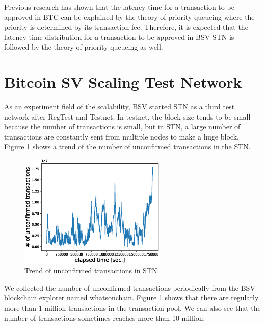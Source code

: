 \documentclass[graybox]{svmult}
\begin{document}
Previous research\cite{KK2019} has shown that the latency time for a transaction to be approved in BTC can be explained by the theory of priority queueing where the priority is determined by its transaction fee.
Therefore, it is expected that the latency time distribution for a transaction to be approved in BSV STN is followed by the theory of priority queueing as well. 



\section{Bitcoin SV Scaling Test Network}
\label{sec:stn}

As an experiment field of the scalability, BSV started STN as a third test network after RegTest and Testnet. 
In testnet, the block size tends to be small because the number of transactions is small, but in STN, a large number of transactions are constantly sent from multiple nodes to make a huge block. 
Figure \ref{fig:unconfirmed_tx} shows a trend of the number of unconfirmed transactions in the STN. 
%
\begin{figure}[t]
  \vspace{-35mm}
  \begin{center}
    \includegraphics[width=70mm]{time_vs_tx-plot.eps}
  \end{center}
  \vspace{35mm}
  \caption{Trend of unconfirmed transactions in STN.}
  \label{fig:unconfirmed_tx}
\end{figure}
%
We collected the number of unconfirmed transactions periodically from the BSV blockchain explorer named whatsonchain\cite{woc}.
Figure \ref{fig:unconfirmed_tx} shows that there are regularly more than 1 million transactions in the transaction pool. 
We can also see that the number of transactions sometimes reaches more than 10 million.
\end{document}
